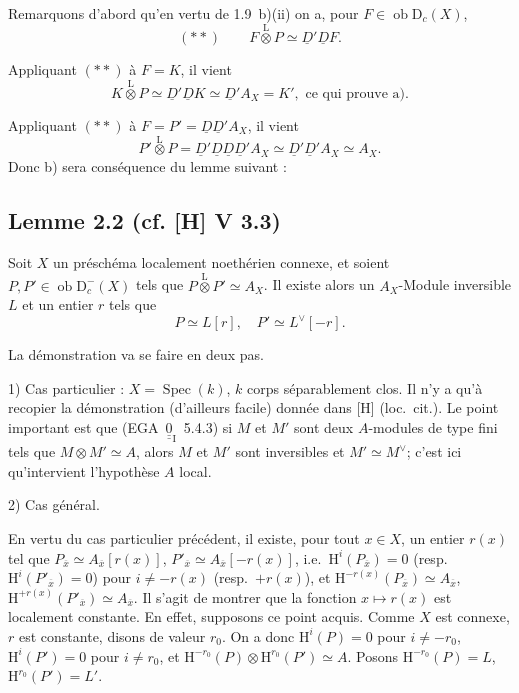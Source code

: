 \documentclass[11pt]{article}
\renewcommand{\H}{\mathrm{H}}
\DeclareMathOperator{\Spec}{Spec}
\newcommand{\D}{\mathrm{D}}
\newcommand{\ob}{\operatorname{ob}}
\newcommand{\ol}[1]{\overline{#1}}
\providecommand{\ob}{\operatorname{ob}}
\providecommand{\Spec}{\operatorname{Spec}}
\providecommand{\Spec}{\operatorname{Spec}}
\providecommand{\Spec}{\operatorname{Spec}}
\providecommand{\Spec}{\operatorname{Spec}}
\begin{document}
Remarquons d'abord qu'en vertu de 1.9~b)(ii) on a, pour $F \in \ob \D_c(X)$,
\[
(**) \qquad F \mathop{\otimes}\limits^{\mathrm{L}} P \simeq \underline{D}'\underline{D} F.
\]

Appliquant $(**)$ à $F = K$, il vient
\[
K \mathop{\otimes}\limits^{\mathrm{L}} P \simeq \underline{D}'\underline{D} K \simeq \underline{D}' A_X = K', \text{ ce qui prouve a).}
\]

Appliquant $(**)$ à $F = P' = \underline{D}\underline{D}'A_X$, il vient
\[
P' \mathop{\otimes}\limits^{\mathrm{L}} P = \underline{D}'\underline{D}\underline{D}\underline{D}'A_X \simeq \underline{D}'\underline{D}'A_X \simeq A_X.
\]
Donc b) sera conséquence du lemme suivant :

\subsection*{Lemme 2.2 (cf. [H] V 3.3)}
Soit $X$ un préschéma localement noethérien connexe, et soient $P, P' \in \ob \D_c^{-}(X)$ tels que $P \mathop{\otimes}\limits^{\mathrm{L}} P' \simeq A_X$. Il existe alors un $A_X$-Module inversible $L$ et un entier $r$ tels que
\[
P \simeq L[r], \quad P' \simeq L^{\vee}[-r].
\]

La démonstration va se faire en deux pas.

1) Cas particulier : $X = \Spec(k)$, $k$ corps séparablement clos. Il n'y a qu'à recopier la démonstration (d'ailleurs facile) donnée dans [H] (loc.~cit.). Le point important est que (EGA~$\underline{\underline{0}}_{\mathrm{I}}$~5.4.3) si $M$ et $M'$ sont deux $A$-modules de type fini tels que $M \otimes M' \simeq A$, alors $M$ et $M'$ sont inversibles et $M' \simeq M^{\vee}$; c'est ici qu'intervient l'hypothèse $A$ local.

2) Cas général.

En vertu du cas particulier précédent, il existe, pour tout $x \in X$, un entier $r(x)$ tel que $P_{\ol{x}} \simeq A_{\ol{x}}[r(x)]$, $P'_{\ol{x}} \simeq A_{\ol{x}}[-r(x)]$, i.e.~$\H^i(P_{\ol{x}}) = 0$ (resp.~$\H^i(P'_{\ol{x}}) = 0$) pour $i \neq -r(x)$ (resp.~$+r(x)$), et $\H^{-r(x)}(P_{\ol{x}}) \simeq A_{\ol{x}}$, $\H^{+r(x)}(P'_{\ol{x}}) \simeq A_{\ol{x}}$. Il s'agit de montrer que la fonction $x \mapsto r(x)$ est localement constante. En effet, supposons ce
point acquis. Comme $X$ est connexe, $r$ est constante, disons de valeur $r_0$. On a donc $\H^i(P) = 0$ pour $i \neq -r_0$, $\H^i(P') = 0$ pour $i \neq r_0$, et $\H^{-r_0}(P) \otimes \H^{r_0}(P') \simeq A$. Posons $\H^{-r_0}(P) = L$, $\H^{r_0}(P') = L'$.
\end{document}
